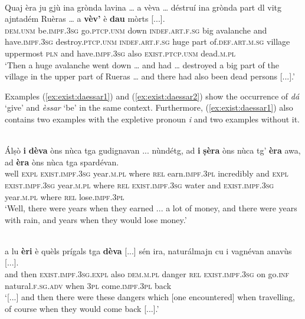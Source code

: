 \ea
\label{ex:exist.da6}
\\
\gll    Quaj èra ju gjù ina grònda lavina … a vèva … déstruí ina grònda part dl vitg ajntadém Ruèras … a \textbf{vèv’} è \textbf{dau} mòrts [...].\\
\textsc{dem.unm} be.\textsc{impf.3sg} go.\textsc{ptcp.unm} down \textsc{indef.art.f.sg} big avalanche {} and have.\textsc{impf.3sg} {} destroy.\textsc{ptcp.unm} \textsc{indef.art.f.sg} huge part of.\textsc{def.art.m.sg} village uppermost \textsc{pln} {} and have.\textsc{impf.3sg} also \textsc{exist.ptcp.unm} dead.\textsc{m.pl}\\
\glt `Then a huge avalanche went down … and had … destroyed a big part of the village in the upper part of Rueras … and there had also been dead persons [...].'
\z

Examples (\ref{ex:exist:daessar1}) and (\ref{ex:exist:daessar2}) show the occurrence of \textit{dá} `give' and \textit{èssar} `be' in the same context. Furthermore, (\ref{ex:exist:daessar1}) also contains two examples with the expletive pronoun \textit{i} and two examples without it.

\ea
\label{ex:exist:daessar1}
\\
\gll Álṣò \textbf{i} \textbf{dèva} òns nùca tga gudignavan ... nùndétg, ad \textbf{i} \textbf{ṣèra} òns nùca tg’ \textbf{èra} awa, ad \textbf{èra} òns nùca tga spardévan.\\
well \textsc{expl} \textsc{exist.impf.3sg} year.\textsc{m.pl} where \textsc{rel} earn.\textsc{impf.3pl} {} incredibly and \textsc{expl} \textsc{exist.impf.3sg} year.\textsc{m.pl} where \textsc{rel} \textsc{exist.impf.3sg} water and \textsc{exist.impf.3sg} year.\textsc{m.pl} where \textsc{rel} lose.\textsc{impf.3pl} \\
\glt `Well, there were years when they earned ... a lot of money, and there were years with rain, and years when they would lose money.'
\z

\ea
\label{ex:exist:daessar2}
\\
\gll [...] a lu \textbf{èri} è quèls prígals tga \textbf{dèva} [...] sén ira, naturálmajn cu i vagnévan anavùs [...].\\
{} and then \textsc{exist.impf.3sg.expl} also \textsc{dem.m.pl} danger \textsc{rel} \textsc{exist.impf.3sg} {} on go.\textsc{inf} natural.\textsc{f.sg.adv} when \textsc{3pl} come.\textsc{impf.3pl} back\\
\glt `[...] and then there were these dangers which [one encountered] when travelling, of course when they would come back [...].'
\z



